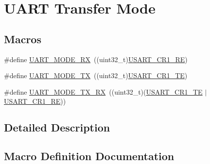\hypertarget{group___u_a_r_t___mode}{}\section{U\+A\+RT Transfer Mode}
\label{group___u_a_r_t___mode}
\subsection*{Macros}
\begin{DoxyCompactItemize}
\item 
\#define \hyperlink{group___u_a_r_t___mode_ga6cdc4e35cd90d15a964994499475e7d7}{U\+A\+R\+T\+\_\+\+M\+O\+D\+E\+\_\+\+RX}~((uint32\+\_\+t)\hyperlink{group___peripheral___registers___bits___definition_gada0d5d407a22264de847bc1b40a17aeb}{U\+S\+A\+R\+T\+\_\+\+C\+R1\+\_\+\+RE})
\item 
\#define \hyperlink{group___u_a_r_t___mode_gad54f095a1073bcd81787d13fc268bd62}{U\+A\+R\+T\+\_\+\+M\+O\+D\+E\+\_\+\+TX}~((uint32\+\_\+t)\hyperlink{group___peripheral___registers___bits___definition_gade7f090b04fd78b755b43357ecaa9622}{U\+S\+A\+R\+T\+\_\+\+C\+R1\+\_\+\+TE})
\item 
\#define \hyperlink{group___u_a_r_t___mode_gab47c162935901e89322e2ce6700b6744}{U\+A\+R\+T\+\_\+\+M\+O\+D\+E\+\_\+\+T\+X\+\_\+\+RX}~((uint32\+\_\+t)(\hyperlink{group___peripheral___registers___bits___definition_gade7f090b04fd78b755b43357ecaa9622}{U\+S\+A\+R\+T\+\_\+\+C\+R1\+\_\+\+TE} $\vert$\hyperlink{group___peripheral___registers___bits___definition_gada0d5d407a22264de847bc1b40a17aeb}{U\+S\+A\+R\+T\+\_\+\+C\+R1\+\_\+\+RE}))
\end{DoxyCompactItemize}


\subsection{Detailed Description}


\subsection{Macro Definition Documentation}
\mbox{\label{group___u_a_r_t___mode_ga6cdc4e35cd90d15a964994499475e7d7}} 
